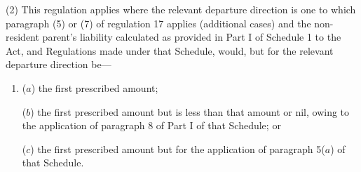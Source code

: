\documentclass[12pt,a4paper]{article}
\begin{document}
(2) This regulation applies where the relevant departure direction is one to which paragraph (5) or (7) of regulation 17 applies (additional cases) and the non-resident parent’s liability calculated as provided in Part I of Schedule 1 to the Act, and Regulations made under that Schedule, would, but for the relevant departure direction be—
\begin{enumerate}\item[]
($a$) the first prescribed amount;

($b$) the first prescribed amount but is less than that amount or nil, owing to the application of paragraph 8 of Part I of that Schedule; or

($c$) the first prescribed amount but for the application of paragraph 5($a$)  of that Schedule.
\end{enumerate}
\end{document}
